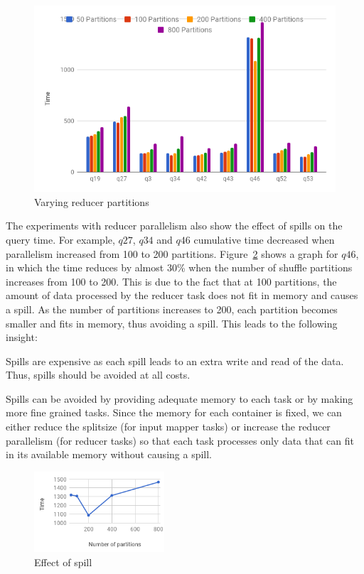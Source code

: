 \begin{figure}[h]
	\includegraphics[width=\linewidth]{fig/varyreducers.png}
	\caption{Varying reducer partitions \protect\footnotemark[1]}
	\label{fig:varyreducers}
\end{figure}


The experiments with reducer parallelism also show the effect of spills on the query time. For example, $q27$, $q34$ and $q46$ cumulative time decreased when parallelism increased from 100 to 200 partitions. Figure~\ref{fig:q46} shows a graph for $q46$, in which the time reduces by almost 30\% when the number of shuffle partitions increases from 100 to 200. This is due to the fact that at 100 partitions, the amount of data processed by the reducer task does not fit in memory and causes a spill. As the number of partitions increases to 200, each partition becomes smaller and fits in memory, thus avoiding a spill. This leads to the following insight:
\begin{insight}
	\label{insight:spill}
	Spills are expensive as each spill leads to an extra write and read of the data. Thus, spills should be avoided at all costs.
\end{insight}
Spills can be avoided by providing adequate memory to each task or by making more fine grained tasks. Since the memory for each container is fixed, we can either reduce the splitsize (for input mapper tasks) or increase the reducer parallelism (for reducer tasks) so that each task processes only data that can fit in its available memory without causing a spill.

\begin{figure}[h]
	\centering\includegraphics[height=3cm]{fig/q46.png}
	\caption{Effect of spill}
	\label{fig:q46}
\end{figure}


